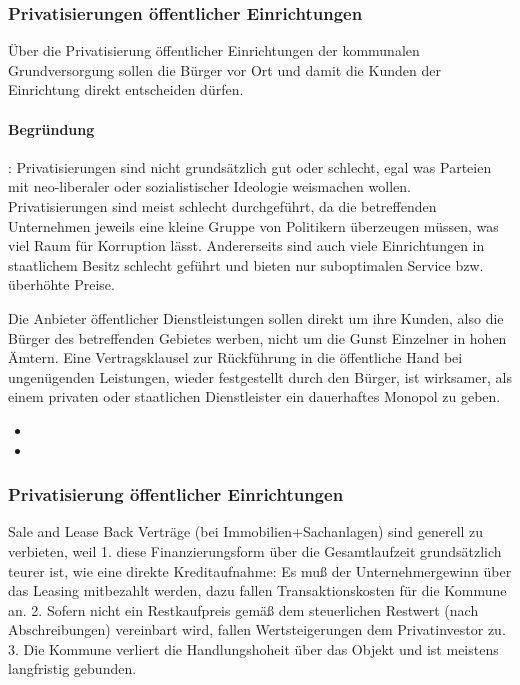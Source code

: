 \subsubsection{Privatisierungen öffentlicher Einrichtungen}
\abstimmung
Über die Privatisierung öffentlicher Einrichtungen der kommunalen Grundversorgung sollen die Bürger vor Ort und damit die Kunden der Einrichtung direkt entscheiden dürfen.

\paragraph{Begründung}: Privatisierungen sind nicht grundsätzlich gut oder schlecht, egal was Parteien mit neo-liberaler oder sozialistischer Ideologie weismachen wollen. Privatisierungen sind meist schlecht durchgeführt, da die betreffenden Unternehmen jeweils eine kleine Gruppe von Politikern überzeugen müssen, was viel Raum für Korruption lässt. Andererseits sind auch viele Einrichtungen in staatlichem Besitz schlecht geführt und bieten nur suboptimalen Service bzw. überhöhte Preise.

Die Anbieter öffentlicher Dienstleistungen sollen direkt um ihre Kunden, also die Bürger des betreffenden Gebietes werben, nicht um die Gunst Einzelner in hohen Ämtern. Eine Vertragsklausel zur Rückführung in die öffentliche Hand bei ungenügenden Leistungen, wieder festgestellt durch den Bürger, ist wirksamer, als einem privaten oder staatlichen Dienstleister ein dauerhaftes Monopol zu geben.
 
\label{wp:wirt:privat3}
\begin{itemize}
\item {}
\item {}
\end{itemize}

\subsubsection{Privatisierung öffentlicher Einrichtungen}
\abstimmung
Sale and Lease Back Verträge (bei Immobilien+Sachanlagen) sind generell zu verbieten, weil 1. diese Finanzierungsform über die Gesamtlaufzeit grundsätzlich teurer ist, wie eine direkte Kreditaufnahme: Es muß der Unternehmergewinn über das Leasing mitbezahlt werden, dazu fallen Transaktionskosten für die Kommune an. 2. Sofern nicht ein Restkaufpreis gemäß dem steuerlichen Restwert (nach Abschreibungen) vereinbart wird, fallen Wertsteigerungen dem Privatinvestor zu. 3. Die Kommune verliert die Handlungshoheit über das Objekt und ist meistens langfristig gebunden.


